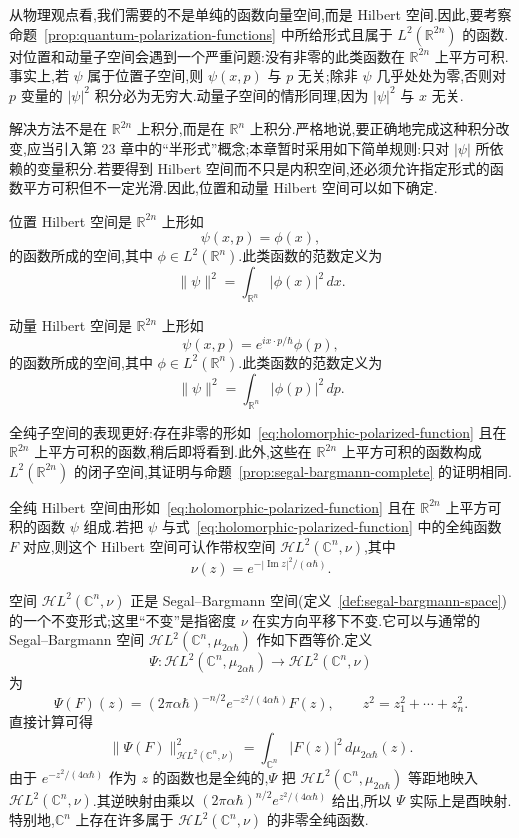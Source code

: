 从物理观点看,我们需要的不是单纯的函数向量空间,而是 Hilbert 空间.因此,要考察命题~\ref{prop:quantum-polarization-functions} 中所给形式且属于 $L^2(\mathbb R^{2n})$ 的函数.对位置和动量子空间会遇到一个严重问题:没有非零的此类函数在 $\mathbb R^{2n}$ 上平方可积.事实上,若 $\psi$ 属于位置子空间,则 $\psi(x,p)$ 与 $p$ 无关;除非 $\psi$ 几乎处处为零,否则对 $p$ 变量的 $|\psi|^2$ 积分必为无穷大.动量子空间的情形同理,因为 $|\psi|^2$ 与 $x$ 无关.

解决方法不是在 $\mathbb R^{2n}$ 上积分,而是在 $\mathbb R^n$ 上积分.严格地说,要正确地完成这种积分改变,应当引入第 23 章中的“半形式”概念;本章暂时采用如下简单规则:只对 $|\psi|$ 所依赖的变量积分.若要得到 Hilbert 空间而不只是内积空间,还必须允许指定形式的函数平方可积但不一定光滑.因此,位置和动量 Hilbert 空间可以如下确定.

\begin{conclusion}
\label{con:position-momentum-hilbert-spaces}
位置 Hilbert 空间是 $\mathbb R^{2n}$ 上形如
\[
 \psi(x,p)=\phi(x),
\]
的函数所成的空间,其中 $\phi\in L^2(\mathbb R^n)$.此类函数的范数定义为
\[
 \|\psi\|^2=\int_{\mathbb R^n}|\phi(x)|^2\,dx.
\]

动量 Hilbert 空间是 $\mathbb R^{2n}$ 上形如
\[
 \psi(x,p)=e^{ix\cdot p/\hbar}\phi(p),
\]
的函数所成的空间,其中 $\phi\in L^2(\mathbb R^n)$.此类函数的范数定义为
\[
 \|\psi\|^2=\int_{\mathbb R^n}|\phi(p)|^2\,dp.
\]
\end{conclusion}

全纯子空间的表现更好:存在非零的形如~\eqref{eq:holomorphic-polarized-function} 且在 $\mathbb R^{2n}$ 上平方可积的函数,稍后即将看到.此外,这些在 $\mathbb R^{2n}$ 上平方可积的函数构成 $L^2(\mathbb R^{2n})$ 的闭子空间,其证明与命题~\ref{prop:segal-bargmann-complete} 的证明相同.

\begin{conclusion}
\label{con:holomorphic-hilbert-space}
全纯 Hilbert 空间由形如~\eqref{eq:holomorphic-polarized-function} 且在 $\mathbb R^{2n}$ 上平方可积的函数 $\psi$ 组成.若把 $\psi$ 与式~\eqref{eq:holomorphic-polarized-function} 中的全纯函数 $F$ 对应,则这个 Hilbert 空间可认作带权空间 $\mathcal H L^2(\mathbb C^n,\nu)$,其中
\[
 \nu(z)=e^{-|\operatorname{Im}z|^2/(\alpha\hbar)}.
\]
\end{conclusion}

空间 $\mathcal H L^2(\mathbb C^n,\nu)$ 正是 Segal--Bargmann 空间(定义~\ref{def:segal-bargmann-space})的一个不变形式;这里“不变”是指密度 $\nu$ 在实方向平移下不变.它可以与通常的 Segal--Bargmann 空间 $\mathcal H L^2(\mathbb C^n,\mu_{2\alpha\hbar})$ 作如下酉等价.定义
\[
 \Psi:\mathcal H L^2(\mathbb C^n,\mu_{2\alpha\hbar})\longrightarrow
 \mathcal H L^2(\mathbb C^n,\nu)
\]
为
\[
 \Psi(F)(z)=(2\pi\alpha\hbar)^{-n/2}
 e^{-z^2/(4\alpha\hbar)}F(z),
 \qquad z^2=z_1^2+\cdots+z_n^2.
 \label{eq:invariant-segal-bargmann-map}
\]
直接计算可得
\[
 \|\Psi(F)\|_{\mathcal H L^2(\mathbb C^n,\nu)}^2
 =\int_{\mathbb C^n}|F(z)|^2\,d\mu_{2\alpha\hbar}(z).
\]
由于 $e^{-z^2/(4\alpha\hbar)}$ 作为 $z$ 的函数也是全纯的,$\Psi$ 把 $\mathcal H L^2(\mathbb C^n,\mu_{2\alpha\hbar})$ 等距地映入 $\mathcal H L^2(\mathbb C^n,\nu)$.其逆映射由乘以 $(2\pi\alpha\hbar)^{n/2}e^{z^2/(4\alpha\hbar)}$ 给出,所以 $\Psi$ 实际上是酉映射.特别地,$\mathbb C^n$ 上存在许多属于 $\mathcal H L^2(\mathbb C^n,\nu)$ 的非零全纯函数.

